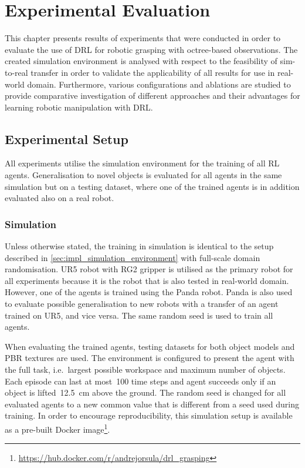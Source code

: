 \chapter{Experimental Evaluation}\label{ch:experimental_evaluation}

This chapter presents results of experiments that were conducted in order to evaluate the use of DRL for robotic grasping with octree-based observations. The created simulation environment is analysed with respect to the feasibility of sim-to-real transfer in order to validate the applicability of all results for use in real-world domain. Furthermore, various configurations and ablations are studied to provide comparative investigation of different approaches and their advantages for learning robotic manipulation with DRL.


\section{Experimental Setup}

All experiments utilise the simulation environment for the training of all RL agents. Generalisation to novel objects is evaluated for all agents in the same simulation but on a testing dataset, where one of the trained agents is in addition evaluated also on a real robot.


\subsection{Simulation}

Unless otherwise stated, the training in simulation is identical to the setup described in \autoref{sec:impl_simulation_environment} with full-scale domain randomisation. UR5 robot with RG2 gripper is utilised as the primary robot for all experiments because it is the robot that is also tested in real-world domain. However, one of the agents is trained using the Panda robot. Panda is also used to evaluate possible generalisation to new robots with a transfer of an agent trained on UR5, and vice versa. The same random seed is used to train all agents.

When evaluating the trained agents, testing datasets for both object models and PBR textures are used. The environment is configured to present the agent with the full task, i.e.~largest possible workspace and maximum number of objects. Each episode can last at most~100 time steps and agent succeeds only if an object is lifted~12.5~cm above the ground. The random seed is changed for all evaluated agents to a new common value that is different from a seed used during training. In order to encourage reproducibility, this simulation setup is available as a pre-built Docker image\footnote{\href{https://hub.docker.com/r/andrejorsula/drl_grasping}{https://hub.docker.com/r/andrejorsula/drl\_grasping}}.


